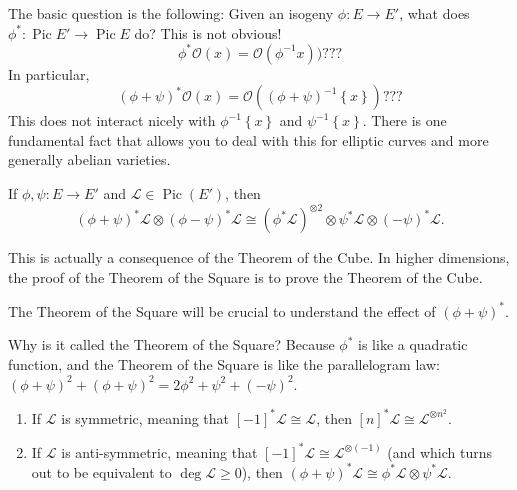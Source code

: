 The basic question is the following: Given an isogeny \( \phi \colon E \to E' \), what does \( \phi^* \colon \operatorname{Pic} E' \to \operatorname{Pic} E \) do?
This is not obvious!
\[ \phi^*\mathcal{O}(x) = \mathcal{O}(\phi^{-1} x)) ??? \]
In particular,
\[ \left( \phi + \psi \right)^* \mathcal{O}(x) = \mathcal{O} \left( (\phi + \psi)^{-1} \left\lbrace x \right\rbrace \right) ??? \]
This does not interact nicely with \( \phi^{-1} \left\lbrace x \right\rbrace \) and \( \psi^{-1} \left\lbrace x \right\rbrace \).
There is one fundamental fact that allows you to deal with this for elliptic curves and more generally abelian varieties.
\begin{theorem}
  If \( \phi, \psi \colon E \to E' \) and \( \mathcal{L} \in \operatorname{Pic}(E') \), then
  \[ (\phi + \psi)^* \mathcal{L} \otimes (\phi - \psi)^* \mathcal{L} \cong (\phi^* \mathcal{L})^{\otimes 2} \otimes \psi^* \mathcal{L} \otimes (-\psi)^* \mathcal{L}. \]
\end{theorem}
\begin{remark}
  This is actually a consequence of the Theorem of the Cube.
  In higher dimensions, the proof of the Theorem of the Square is to prove the Theorem of the Cube.
\end{remark}
\begin{remark}
  The Theorem of the Square will be crucial to understand the effect of \( (\phi + \psi)^* \).
\end{remark}
\begin{remark}
  Why is it called the Theorem of the Square? Because \( \phi^* \) is like a quadratic function, and the Theorem of the Square is like the parallelogram law: \( (\phi + \psi)^2 + (\phi + \psi)^2 = 2 \phi^2 + \psi^2 + (-\psi)^2 \).
\end{remark}
\begin{corollary}
  \begin{enumerate}
  \item If \( \mathcal{L} \) is symmetric, meaning that \( [-1]^* \mathcal{L} \cong \mathcal{L} \), then \( [n]^* \mathcal{L} \cong \mathcal{L}^{\otimes n^2} \).
  \item If \( \mathcal{L} \) is anti-symmetric, meaning that \( [-1]^* \mathcal{L} \cong \mathcal{L}^{\otimes (-1)} \) (and which turns out to be equivalent to \( \operatorname{deg} \mathcal{L}\geq 0 \)), then \( (\phi + \psi)^* \mathcal{L} \cong \phi^* \mathcal{L} \otimes \psi^* \mathcal{L} \).
  \end{enumerate}
\end{corollary}
